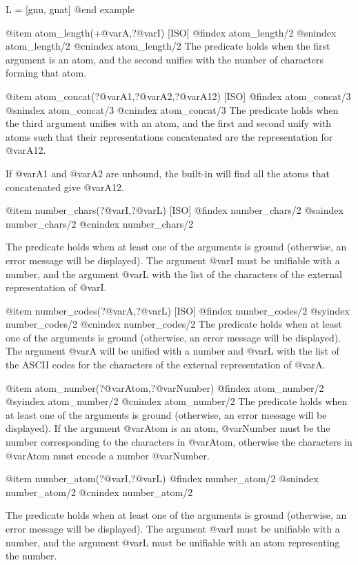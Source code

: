 {{{{L = [gnu, gnat]
@end example

@item atom_length(+@var{A},?@var{I}) [ISO]
@findex atom_length/2
@snindex atom_length/2
@cnindex atom_length/2
The predicate holds when the first argument is an atom, and the second
unifies with the number of characters forming that atom.

@item atom_concat(?@var{A1},?@var{A2},?@var{A12}) [ISO]
@findex atom_concat/3
@snindex atom_concat/3
@cnindex atom_concat/3
The predicate holds when the third argument unifies with an atom, and
the first and second unify with atoms such that their representations
concatenated are the representation for @var{A12}.

If @var{A1} and @var{A2} are unbound, the built-in will find all the atoms
that concatenated give @var{A12}.

@item number_chars(?@var{I},?@var{L}) [ISO]
@findex number_chars/2
@saindex number_chars/2
@cnindex number_chars/2

The predicate holds when at least one of the arguments is ground
(otherwise, an error message will be displayed). The argument @var{I} must
be unifiable with a number, and the argument @var{L} with the list of the
characters of the external representation of @var{I}.

@item number_codes(?@var{A},?@var{L}) [ISO]
@findex number_codes/2
@syindex number_codes/2
@cnindex number_codes/2
The predicate holds when at least one of the arguments is ground
(otherwise, an error message will be displayed). The argument @var{A}
will be unified with a number and @var{L} with the list of the ASCII
codes for the characters of the external representation of @var{A}.

@item atom_number(?@var{Atom},?@var{Number})
@findex atom_number/2
@syindex atom_number/2
@cnindex atom_number/2
The predicate holds when at least one of the arguments is ground
(otherwise, an error message will be displayed). If the argument
@var{Atom} is an atom, @var{Number} must be the number corresponding
to the characters in @var{Atom}, otherwise the characters in
@var{Atom} must encode a number @var{Number}.

@item number_atom(?@var{I},?@var{L})
@findex number_atom/2
@snindex number_atom/2
@cnindex number_atom/2

The predicate holds when at least one of the arguments is ground
(otherwise, an error message will be displayed). The argument @var{I} must
be unifiable with a number, and the argument @var{L} must be unifiable
with an atom representing the number.

}}}}
